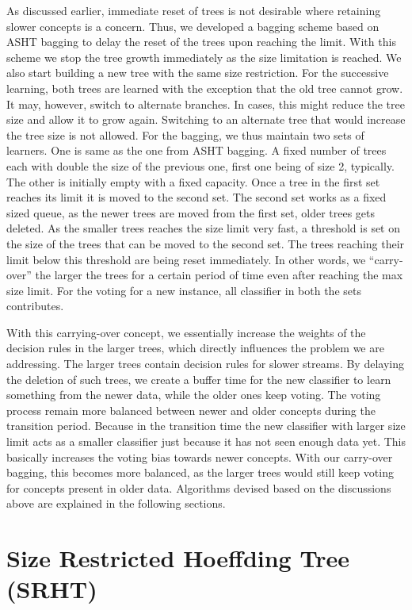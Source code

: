 As discussed earlier,  immediate reset of trees is not desirable where retaining  slower concepts is a concern. Thus, we developed a bagging scheme based on ASHT bagging to delay the reset of the trees upon reaching the limit. With this scheme we stop the tree growth immediately as the size limitation is reached. We also start building a new tree with the same size restriction. For the successive learning, both trees are learned with the exception that the old tree cannot grow. It may, however, switch to alternate branches. In cases, this might reduce the tree size and allow it to grow again. Switching to an alternate tree that would increase the tree size is not allowed. For the bagging, we thus maintain two sets of learners. One is same as the one from ASHT bagging. A fixed number of trees each with double the size of the previous one, first one being of size 2, typically. The other is initially empty with a fixed capacity. Once a tree in the first set reaches its limit it is moved to the second set. The second set works as a fixed sized queue, as the newer trees are moved from the first set, older trees gets deleted. As the smaller trees reaches the size limit very fast, a threshold is set on the size of the trees that can be moved to the second set. The trees reaching their limit below this threshold are being reset immediately. In other words, we ``carry-over'' the larger the trees for a certain period of time even after reaching the max size limit. For the voting for a new instance, all classifier in both the sets contributes.

With this carrying-over concept, we essentially increase the weights of the decision rules in the larger trees, which directly influences the problem we are addressing. The larger trees contain decision rules for slower streams. By delaying the deletion of such trees, we create a buffer time for the new classifier to learn something from the newer data, while the older ones keep voting. The voting process remain more balanced between newer and older concepts during the transition period. Because in the transition time the new classifier with larger size limit acts as a smaller classifier just because it has not seen enough data yet. This basically increases the voting bias towards newer concepts. With our  carry-over bagging, this becomes more balanced, as the larger trees would still keep voting for concepts present in older data. Algorithms devised based on the discussions above are explained in the following sections.

\section{Size Restricted Hoeffding Tree (SRHT)}

